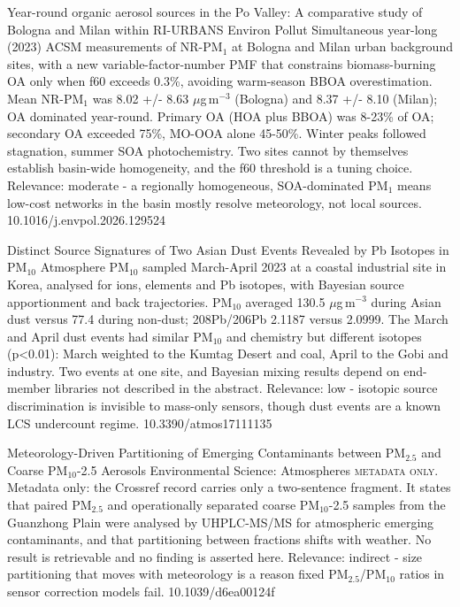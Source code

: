 \documentclass[10pt]{article}
\begin{document}
{Year-round organic aerosol sources in the Po Valley: A comparative study of Bologna and Milan within RI-URBANS}
{Environ Pollut}
{Simultaneous year-long (2023) ACSM measurements of NR-PM$_{1}$ at Bologna and Milan urban background sites, with a new variable-factor-number PMF that constrains biomass-burning OA only when f60 exceeds 0.3\%, avoiding warm-season BBOA overestimation. Mean NR-PM$_{1}$ was 8.02 +/- 8.63 $\mu$g\,m$^{-3}$ (Bologna) and 8.37 +/- 8.10 (Milan); OA dominated year-round. Primary OA (HOA plus BBOA) was 8-23\% of OA; secondary OA exceeded 75\%, MO-OOA alone 45-50\%. Winter peaks followed stagnation, summer SOA photochemistry. Two sites cannot by themselves establish basin-wide homogeneity, and the f60 threshold is a tuning choice. Relevance: moderate - a regionally homogeneous, SOA-dominated PM$_{1}$ means low-cost networks in the basin mostly resolve meteorology, not local sources.}
{10.1016/j.envpol.2026.129524}

{Distinct Source Signatures of Two Asian Dust Events Revealed by Pb Isotopes in PM$_{10}$}
{Atmosphere}
{PM$_{10}$ sampled March-April 2023 at a coastal industrial site in Korea, analysed for ions, elements and Pb isotopes, with Bayesian source apportionment and back trajectories. PM$_{10}$ averaged 130.5 $\mu$g\,m$^{-3}$ during Asian dust versus 77.4 during non-dust; 208Pb/206Pb 2.1187 versus 2.0999. The March and April dust events had similar PM$_{10}$ and chemistry but different isotopes (p<0.01): March weighted to the Kumtag Desert and coal, April to the Gobi and industry. Two events at one site, and Bayesian mixing results depend on end-member libraries not described in the abstract. Relevance: low - isotopic source discrimination is invisible to mass-only sensors, though dust events are a known LCS undercount regime.}
{10.3390/atmos17111135}

{Meteorology-Driven Partitioning of Emerging Contaminants between PM$_{2.5}$ and Coarse PM$_{10}$-2.5 Aerosols}
{Environmental Science: Atmospheres}
{\textsc{metadata only.} Metadata only: the Crossref record carries only a two-sentence fragment. It states that paired PM$_{2.5}$ and operationally separated coarse PM$_{10}$-2.5 samples from the Guanzhong Plain were analysed by UHPLC-MS/MS for atmospheric emerging contaminants, and that partitioning between fractions shifts with weather. No result is retrievable and no finding is asserted here. Relevance: indirect - size partitioning that moves with meteorology is a reason fixed PM$_{2.5}$/PM$_{10}$ ratios in sensor correction models fail.}
{10.1039/d6ea00124f}
\end{document}
